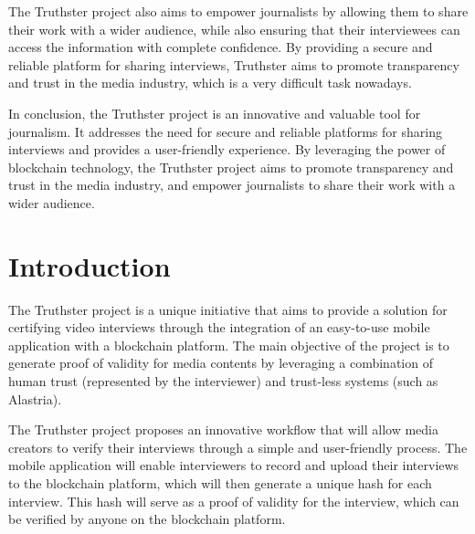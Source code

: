 \documentclass[target=mst,aauheader=]{thud}
\begin{document}
The Truthster project also aims to empower journalists by allowing them to share their work with a wider audience, while also ensuring that their interviewees can access the information with complete confidence. By providing a secure and reliable platform for sharing interviews, Truthster aims to promote transparency and trust in the media industry, which is a very difficult task nowadays.

In conclusion, the Truthster project is an innovative and valuable tool for journalism. It addresses the need for secure and reliable platforms for sharing interviews and provides a user-friendly experience. By leveraging the power of blockchain technology, the Truthster project aims to promote transparency and trust in the media industry, and empower journalists to share their work with a wider audience.

\tableofcontents

\listoftables

\listoffigures



\mainmatter


\chapter{Introduction}

The Truthster project is a unique initiative that aims to provide a solution for certifying video interviews through the integration of an easy-to-use mobile application with a blockchain platform. The main objective of the project is to generate proof of validity for media contents by leveraging a combination of human trust (represented by the interviewer) and trust-less systems (such as Alastria).

The Truthster project proposes an innovative workflow that will allow media creators to verify their interviews through a simple and user-friendly process. The mobile application will enable interviewers to record and upload their interviews to the blockchain platform, which will then generate a unique hash for each interview. This hash will serve as a proof of validity for the interview, which can be verified by anyone on the blockchain platform.
\end{document}
